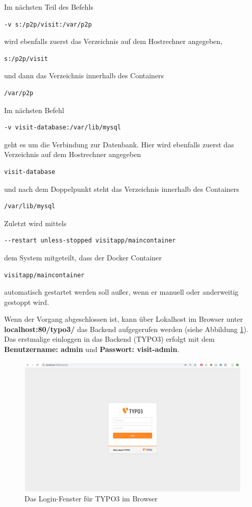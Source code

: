 Im nächsten Teil des Befehls \begin{lstlisting}[style=MyBashStyle]
-v s:/p2p/visit:/var/p2p
\end{lstlisting}
 wird ebenfalls zuerst das Verzeichnis auf dem Hostrechner angegeben, \begin{lstlisting}[style=MyBashStyle]
s:/p2p/visit
\end{lstlisting} und dann das Verzeichnis innerhalb des Containers \begin{lstlisting}[style=MyBashStyle]
/var/p2p
\end{lstlisting}
Im nächsten Befehl \begin{lstlisting}[style=MyBashStyle]
-v visit-database:/var/lib/mysql
\end{lstlisting} geht es um die Verbindung zur Datenbank. Hier wird ebenfalls zuerst das Verzeichnis auf dem Hostrechner angegeben \begin{lstlisting}[style=MyBashStyle]
visit-database
\end{lstlisting} und nach dem Doppelpunkt steht das Verzeichnis innerhalb des Containers \begin{lstlisting}[style=MyBashStyle]
/var/lib/mysql
\end{lstlisting}
Zuletzt wird mittels \begin{lstlisting}[style=MyBashStyle]
--restart unless-stopped visitapp/maincontainer
\end{lstlisting} dem System mitgeteilt, dass der Docker Container \begin{lstlisting}[style=MyBashStyle]
visitapp/maincontainer
\end{lstlisting} automatisch gestartet werden soll außer, wenn er manuell oder anderweitig gestoppt wird.

Wenn der Vorgang abgeschlossen ist, kann über Lokalhost im Browser unter \textbf{localhost:80/typo3/} das Backend aufgegerufen werden (siehe Abbildung \ref{img:typo_3_login}). Das erstmalige einloggen in das Backend (TYPO3) erfolgt mit dem \textbf{Benutzername: admin} und \textbf{Passwort: visit-admin}.

\begin{figure}[ht!]
\centering
\includegraphics[width=12cm]{Figures/paula/typo_3_login.png}
\caption{Das Login-Fenster für TYPO3 im Browser}
\label{img:typo_3_login}
\end{figure}



